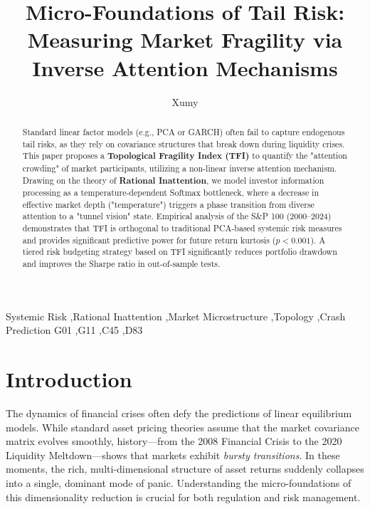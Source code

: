\documentclass[review]{elsarticle}
\begin{document}
\begin{frontmatter}

\title{Micro-Foundations of Tail Risk: Measuring Market Fragility via Inverse Attention Mechanisms}

\author{Xumy}

\address{Institute of Digital Finance, Peking University}

\begin{abstract}
Standard linear factor models (e.g., PCA or GARCH) often fail to capture endogenous tail risks, as they rely on covariance structures that break down during liquidity crises. This paper proposes a \textbf{Topological Fragility Index (TFI)} to quantify the "attention crowding" of market participants, utilizing a non-linear inverse attention mechanism. Drawing on the theory of \textbf{Rational Inattention}, we model investor information processing as a temperature-dependent Softmax bottleneck, where a decrease in effective market depth ("temperature") triggers a phase transition from diverse attention to a "tunnel vision" state. Empirical analysis of the S\&P 100 (2000--2024) demonstrates that TFI is orthogonal to traditional PCA-based systemic risk measures and provides significant predictive power for future return kurtosis ($p < 0.001$). A tiered risk budgeting strategy based on TFI significantly reduces portfolio drawdown and improves the Sharpe ratio in out-of-sample tests.
\end{abstract}

\begin{keyword}
Systemic Risk \sep Rational Inattention \sep Market Microstructure \sep Topology \sep Crash Prediction
\JEL G01 \sep G11 \sep C45 \sep D83
\end{keyword}

\end{frontmatter}

\linenumbers

\section{Introduction}

The dynamics of financial crises often defy the predictions of linear equilibrium models. While standard asset pricing theories assume that the market covariance matrix evolves smoothly, history---from the 2008 Financial Crisis to the 2020 Liquidity Meltdown---shows that markets exhibit \textit{bursty transitions}. In these moments, the rich, multi-dimensional structure of asset returns suddenly collapses into a single, dominant mode of panic. Understanding the micro-foundations of this dimensionality reduction is crucial for both regulation and risk management.
\end{document}
